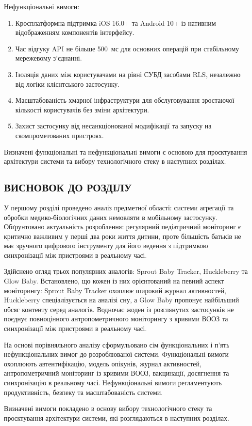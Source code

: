 Нефункціональні вимоги:
\begin{enumerate}
  \item Кросплатформна підтримка iOS 16.0+ та Android 10+ із нативним відображенням компонентів інтерфейсу.
  \item Час відгуку \gls{API} не більше 500~мс для основних операцій при стабільному мережевому з'єднанні.
  \item Ізоляція даних між користувачами на рівні \gls{СУБД} засобами \gls{RLS}, незалежно від логіки клієнтського застосунку.
  \item Масштабованість хмарної інфраструктури для обслуговування зростаючої кількості користувачів без зміни архітектури.
  \item Захист застосунку від несанкціонованої модифікації та запуску на скомпрометованих пристроях.
\end{enumerate}

Визначені функціональні та нефункціональні вимоги є основою для проєктування архітектури системи та вибору технологічного стеку в наступних розділах.

\begin{conclusionsection}

\section{ВИСНОВОК ДО РОЗДІЛУ}

У першому розділі проведено аналіз предметної області: системи агрегації та обробки медико-біологічних даних немовляти в мобільному застосунку. Обґрунтовано актуальність розроблення: регулярний педіатричний моніторинг є критично важливим у перші два роки життя дитини, проте більшість батьків не має зручного цифрового інструменту для його ведення з підтримкою синхронізації між пристроями в реальному часі.

Здійснено огляд трьох популярних аналогів: Sprout Baby Tracker, Huckleberry та Glow Baby. Встановлено, що кожен із них орієнтований на певний аспект моніторингу: Sprout Baby Tracker охоплює широкий журнал активностей, Huckleberry спеціалізується на аналізі сну, а Glow Baby пропонує найбільший обсяг контенту серед аналогів. Водночас жоден із розглянутих застосунків не поєднує повноцінного антропометричного моніторингу з кривими \gls{ВООЗ} та синхронізації між пристроями в реальному часі.

На основі порівняльного аналізу сформульовано сім функціональних і п'ять нефункціональних вимог до розроблюваної системи. Функціональні вимоги охоплюють автентифікацію, модель опікунів, журнал активностей, антропометричний моніторинг із кривими \gls{ВООЗ}, вакцинації, досягнення та синхронізацію в реальному часі. Нефункціональні вимоги регламентують продуктивність, безпеку та масштабованість системи.

Визначені вимоги покладено в основу вибору технологічного стеку та проєктування архітектури системи, які розглядаються в наступних розділах.

\end{conclusionsection}
